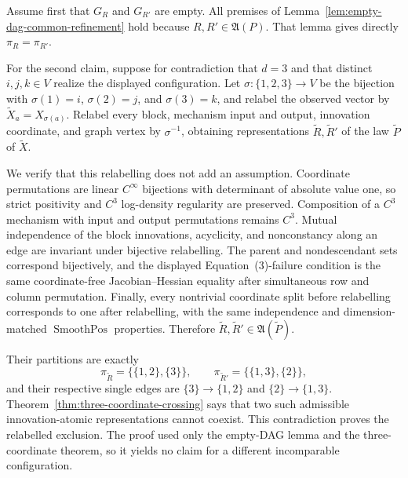 Assume first that \(G_R\) and \(G_{R'}\) are empty.  All premises of
Lemma~\ref{lem:empty-dag-common-refinement} hold because
\(R,R'\in\mathfrak A(P)\).  That lemma gives directly
\(\pi_R=\pi_{R'}\).

For the second claim, suppose for contradiction that \(d=3\) and that distinct
\(i,j,k\in V\) realize the displayed configuration.  Let
\(\sigma:\{1,2,3\}\to V\) be the bijection with
\(\sigma(1)=i\), \(\sigma(2)=j\), and \(\sigma(3)=k\), and relabel the observed
vector by \(\widetilde X_a=X_{\sigma(a)}\).  Relabel every block, mechanism
input and output, innovation coordinate, and graph vertex by \(\sigma^{-1}\),
obtaining representations \(\widetilde R,\widetilde R'\) of the law
\(\widetilde P\) of \(\widetilde X\).

We verify that this relabelling does not add an assumption.  Coordinate
permutations are linear \(C^\infty\) bijections with determinant of absolute
value one, so strict positivity and \(C^3\) log-density regularity are
preserved.  Composition of a \(C^3\) mechanism with input and output
permutations remains \(C^3\).  Mutual independence of the block innovations,
acyclicity, and nonconstancy along an edge are invariant under bijective
relabelling.  The parent and nondescendant sets correspond bijectively, and
the displayed Equation~(3)-failure condition is the same coordinate-free
Jacobian--Hessian equality after simultaneous row and column permutation.
Finally, every nontrivial coordinate split before relabelling corresponds to
one after relabelling, with the same independence and
dimension-matched \(\operatorname{SmoothPos}\) properties.  Therefore
\(\widetilde R,\widetilde R'\in\mathfrak A(\widetilde P)\).

Their partitions are exactly
\[
 \pi_{\widetilde R}=\{\{1,2\},\{3\}\},\qquad
 \pi_{\widetilde R'}=\{\{1,3\},\{2\}\},
\]
and their respective single edges are
\(\{3\}\to\{1,2\}\) and \(\{2\}\to\{1,3\}\).
Theorem~\ref{thm:three-coordinate-crossing} says that two such admissible
innovation-atomic representations cannot coexist.  This contradiction proves
the relabelled exclusion.  The proof used only the empty-DAG lemma and the
three-coordinate theorem, so it yields no claim for a different incomparable
configuration.